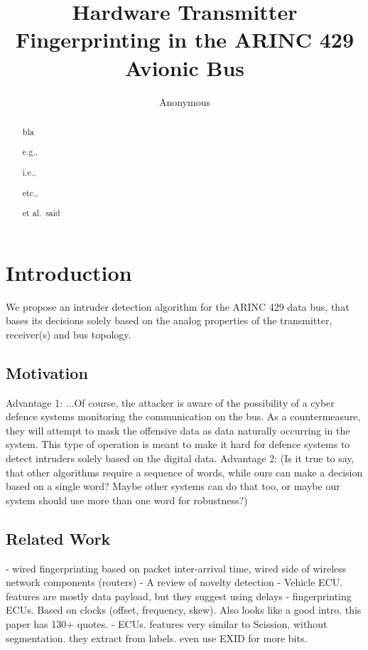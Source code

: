 \documentclass[conference]{IEEEtran}
\title{Hardware Transmitter Fingerprinting in the ARINC 429 Avionic Bus}
\author{Anonymous}
\begin{document}
\maketitle

\begin{abstract}
    bla
    
    e.g., 
    
    i.e.,
    
    etc.,
    
    et al.\ said
    
\end{abstract}


\section{Introduction}
  \color{gray}
  We propose an intruder detection algorithm for the ARINC 429 data bus, that bases its decisions solely based on the analog properties of the transmitter, receiver(s) and bus topology.
  \color{black}

\subsection{Motivation}
  \color{gray}
  Advantage 1: ...Of course, the attacker is aware of the possibility of a cyber defence systems monitoring the communication on the bus. As a countermeasure, they will attempt to mask the offensive data as data naturally occurring in the system. This type of operation is meant to make it hard for defence systems to detect intruders solely based on the digital data. Advantage 2: (Is it true to say, that other algorithms require a sequence of words, while ours can make a decision based on a single word? Maybe other systems can do that too, or maybe our system should use more than one word for robustness?)
  \color{black}

\subsection{Related Work}
  \cite{uluagac2013passive} - wired fingerprinting based on packet inter-arrival time, wired side of wireless network components (routers)
  \cite{pimentel2014review} - A review of novelty detection
  \cite{jaynes2016automating} - Vehicle ECU. features are mostly data payload, but they suggest using delays
  \cite{cho2016fingerprinting} - fingerprinting ECUs. Based on clocks (offset, frequency, skew). Also looks like a good intro. this paper has 130+ quotes.
  \cite{choi2018identifying} - ECUs. features very similar to Scission, without segmentation. they extract from labels. even use EXID for more bits.
  
\end{document}
